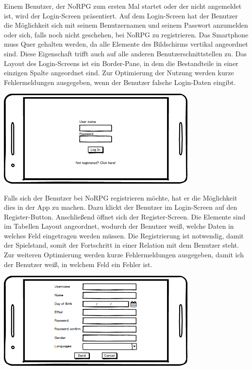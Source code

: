 			Einem Benutzer, der NoRPG zum ersten Mal startet oder der nicht angemeldet ist, wird der Login-Screen präsentiert. Auf dem Login-Screen hat der Benutzer die Möglichkeit sich mit seinem Benutzernamen und seinem Passwort anzumelden oder sich, falls noch nicht geschehen, bei NoRPG zu registrieren. Das Smartphone muss Quer gehalten werden, da alle Elemente des Bildschirms vertikal angeordnet sind. Diese Eigenschaft trifft auch auf alle anderen Benutzerschnittstellen zu. Das Layout des Login-Screens ist ein Border-Pane, in dem die Bestandteile in einer einzigen Spalte angeordnet sind. Zur Optimierung der Nutzung werden kurze Fehlermeldungen ausgegeben, wenn der Benutzer falsche Login-Daten eingibt.
			\begin{center}
				\includegraphics[width=10cm]{pics/Login_Mockup.png}
			\end{center}
			
			Falls sich der Benutzer bei NoRPG registrieren möchte, hat er die Möglichkeit dies in der App zu machen. Dazu klickt der Benutzer im Login-Screen auf den Register-Button. Anschließend öffnet sich der Register-Screen. Die Elemente sind im Tabellen Layout angeordnet, wodurch der Benutzer weiß, welche Daten in welches Feld eingetragen werden müssen. Die Registrierung ist notwendig, damit der Spielstand, somit der Fortschritt in einer Relation mit dem Benutzer steht. Zur weiteren Optimierung werden kurze Fehlermeldungen ausgegeben, damit ich der Benutzer weiß, in welchem Feld ein Fehler ist.
			
			\begin{center}
				\includegraphics[width=10cm]{pics/Register_Mockup.png}
			\end{center}
			
